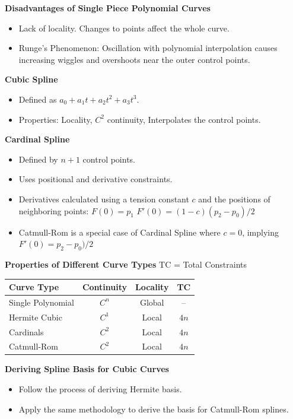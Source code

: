 \documentclass[letterpaper, 8pt]{extarticle}
\begin{document}
\begin{multicols*}{4}
    \textbf{Disadvantages of Single Piece Polynomial Curves}
    \begin{itemize}
        \item Lack of locality. Changes to points affect the whole curve.
        \item Runge's Phenomenon: Oscillation with polynomial interpolation causes increasing wiggles and overshoots near the outer control points.
    \end{itemize}


    \textbf{Cubic Spline}
    \begin{itemize}
        \item Defined as $a_0 + a_1t + a_2t^2 + a_3t^3$.
        \item Properties: Locality, $C^2$ continuity, Interpolates the control points.
    \end{itemize}

    \textbf{Cardinal Spline}
    \begin{itemize}
        \item Defined by $n+1$ control points.
        \item Uses positional and derivative constraints.
        \item Derivatives calculated using a tension constant $c$ and the positions of neighboring points: $F(0) = p_1$ $F'(0) = (1-c)(p_2 - p_0)/2$
        \item Catmull-Rom is a special case of Cardinal Spline where $c = 0$, implying $ F'(0) = p_2 - p_0)/2$
    \end{itemize}

    \textbf{Properties of Different Curve Types}
    TC = Total Constraints
    \begin{center}
        \begin{tabular}{|l|c|c|c|}
            \hline
            Curve Type        & Continuity & Locality & TC   \\
            \hline
            Single Polynomial & $C^n$      & Global   & --   \\
            Hermite Cubic     & $C^1$      & Local    & $4n$ \\
            Cardinals         & $C^2$      & Local    & $4n$ \\
            Catmull-Rom       & $C^2$      & Local    & $4n$ \\
            \hline
        \end{tabular}
    \end{center}

    \textbf{Deriving Spline Basis for Cubic Curves}
    \begin{itemize}
        \item Follow the process of deriving Hermite basis.
        \item Apply the same methodology to derive the basis for Catmull-Rom splines.
    \end{itemize}


\end{multicols*}
\end{document}
